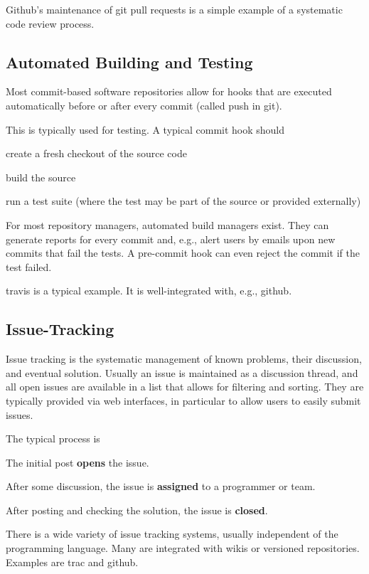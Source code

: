 Github's maintenance of git pull requests is a simple example of a systematic code review process.

\subsection{Automated Building and Testing}

Most commit-based software repositories allow for hooks that are executed automatically before or after every commit (called push in git).

This is typically used for testing.
A typical commit hook should
\begin{compactitem}
 \item create a fresh checkout of the source code
 \item build the source
 \item run a test suite (where the test may be part of the source or provided externally)
\end{compactitem}

For most repository managers, automated build managers exist.
They can generate reports for every commit and, e.g., alert users by emails upon new commits that fail the tests.
A pre-commit hook can even reject the commit if the test failed.

travis is a typical example.
It is well-integrated with, e.g., github.

\subsection{Issue-Tracking}

Issue tracking is the systematic management of known problems, their discussion, and eventual solution.
Usually an issue is maintained as a discussion thread, and all open issues are available in a list that allows for filtering and sorting.
They are typically provided via web interfaces, in particular to allow users to easily submit issues.

The typical process is
\begin{compactenum}
 \item The initial post \textbf{opens} the issue.
 \item After some discussion, the issue is \textbf{assigned} to a programmer or team.
 \item After posting and checking the solution, the issue is \textbf{closed}.
\end{compactenum}

There is a wide variety of issue tracking systems, usually independent of the programming language.
Many are integrated with wikis or versioned repositories.
Examples are trac and github.

